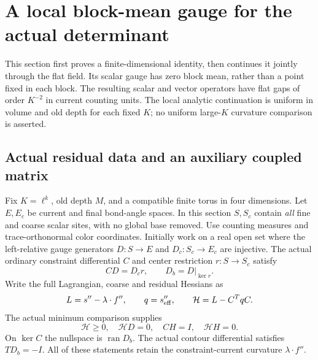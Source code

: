 \section{A local block-mean gauge for the actual determinant}
\label{pql-section}

This section first proves a finite-dimensional identity, then continues
it jointly through the flat field. Its scalar gauge has zero block mean,
rather than a point fixed in each block. The resulting scalar and vector
operators have flat gaps of order $K^{-2}$ in current counting units.
The local analytic continuation is uniform in volume and old depth for
each fixed $K$; no uniform large-$K$ curvature comparison is asserted.

\subsection{Actual residual data and an auxiliary coupled matrix}
\label{pql-actual-data}

Fix $K=\ell^k$, old depth $M$, and a compatible finite torus in four
dimensions. Let $E,E_c$ be current and final bond-angle spaces. In this
section $S,S_c$ contain \emph{all} fine and coarse scalar sites, with no
global base removed. Use counting measures and trace-orthonormal color
coordinates. Initially work on a real open set where the left-relative
gauge generators $D:S\to E$ and $D_c:S_c\to E_c$ are injective.
The actual ordinary constraint differential $C$ and center restriction
$r:S\to S_c$ satisfy
\begin{equation}
 CD=D_cr,\qquad D_b=D|_{\ker r}.
 \label{pql-ordinary-intertwining}
\end{equation}
Write the full Lagrangian, coarse and residual Hessians as
\begin{equation}
 L=s''-\lambda\cdot f'',\qquad q=s_{\rm eff}'',\qquad
 \mathcal H=L-C^TqC.
 \label{pql-residual}
\end{equation}
The actual minimum comparison supplies
\begin{equation}
 \mathcal H\ge0,\quad \mathcal H D=0,\quad CH=I,\quad
 \mathcal H H=0.
 \label{pql-minimum-identities}
\end{equation}
On $\ker C$ the nullspace is $\operatorname{ran}D_b$.
The actual contour differential satisfies $TD_b=-I$.
All of these statements retain the constraint-current curvature
$\lambda\cdot f''$.

